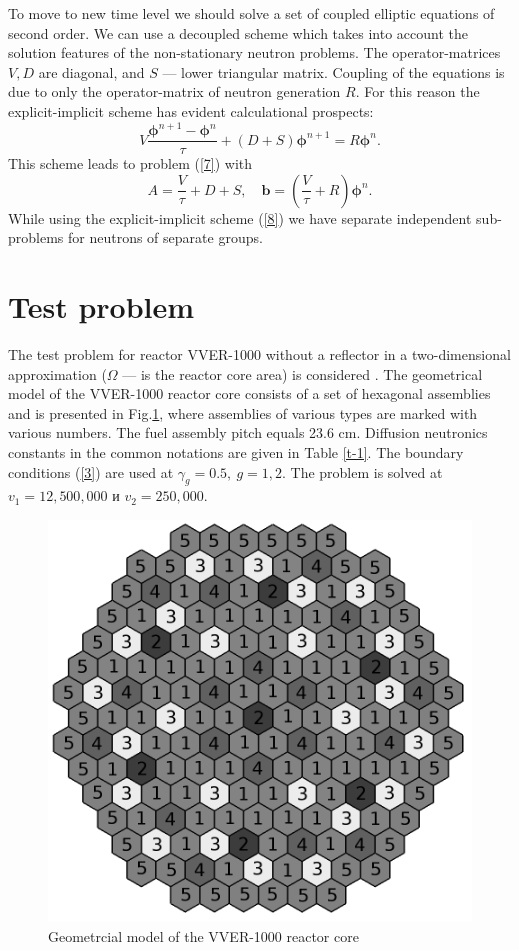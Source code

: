 \documentclass{llncs}
\begin{document}
To move to new time level we should solve a set of coupled elliptic equations of second order. We can use a decoupled scheme which takes into account the solution
features of the non-stationary neutron problems. The operator-matrices $V, D$ are diagonal, and $S$  --- lower triangular matrix.
Coupling of the equations is due to only the operator-matrix of neutron generation $R$.
For this reason the explicit-implicit scheme has evident calculational prospects:
\begin{equation}\label{8}
 V\frac{\bm\phi^{n+1}-\bm\phi^n}{\tau}+(D+S)\bm\phi^{n+1} = R \bm\phi^{n}.
\end{equation} 
This scheme leads to problem (\ref{7}) with
\[
 A = \frac{V}{\tau}+D+S, 
 \quad \bm b = \left(\frac{V}{\tau}+R\right)\bm\phi^n.
\]
While using the explicit-implicit scheme (\ref{8}) we have separate independent sub-problems for neutrons of separate groups.

\section{Test problem}

The test problem for reactor VVER-1000 without a reflector in a two-dimensional approximation ($\Omega$ --- is the reactor core area) is considered \cite{chao}. The geometrical model of the VVER-1000 reactor core consists of a set of hexagonal assemblies and is presented in Fig.\ref{fig:1}, where assemblies of various
types are marked with various numbers. The fuel assembly pitch equals 23.6 cm. Diffusion neutronics constants in the common notations
are given in Table \ref{t-1}. 
The boundary conditions (\ref{3}) are used at $\gamma_g = 0.5, \ g = 1,2$. The problem is solved at $v_1 = 12, 500, 000$ и  $v_2 = 250, 000$.

\begin{figure}[htp]
  \begin{center}
    \includegraphics[width=0.5\linewidth] {1.png}
	\caption{Geometrcial model of the VVER-1000 reactor core}
	\label{fig:1}
  \end{center}
\end{figure} 
\end{document}
